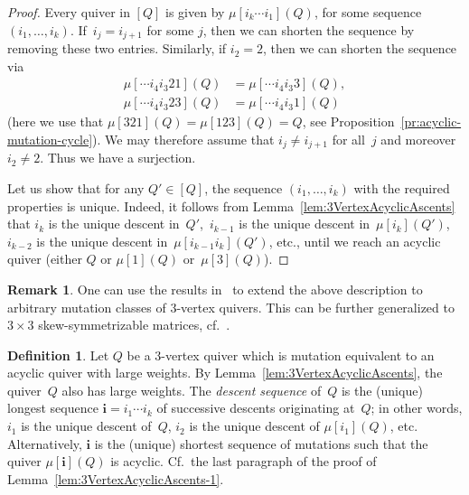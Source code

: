 \documentclass[11pt, letterpaper]{amsart}
\newcommand{\comment}[1]{{\noindent\textsf{\color{blue}$\clubsuit$~#1~$\clubsuit$}}}
\theoremstyle{definition}
\newtheorem{remark}[theorem]{Remark}
\newtheorem{definition}[theorem]{Definition}
\numberwithin{equation}{section}
\newcommand{\T}[2]{\mu[#1](#2)} %
\begin{document}
\begin{proof}
Every quiver in $[Q]$ is given by $\mu[i_k \cdots i_1](Q)$, for some sequence $(i_1,\dots,i_k)$. 
If~$i_j=i_{j+1}$ for some $j$, then we can shorten the sequence by removing these two entries.
Similarly, if $i_2=2$, then we can shorten the sequence via 
\begin{align*}
\T{\cdots i_4 i_3 2 1}{Q}&=\T{\cdots i_4 i_3 3}{Q}, \\
\T{\cdots i_4 i_3 2 3}{Q}&=\T{\cdots i_4 i_3 1}{Q}
\end{align*}
(here we use that $\T{321}{Q}=\T{123}{Q}=Q$, see Proposition~\ref{pr:acyclic-mutation-cycle}). 
We may therefore assume that $i_j \neq i_{j+1}$ for all~$j$ and moreover
$i_2\neq 2$. Thus we have a surjection.

\pagebreak[3]

Let us show that for any $Q'\in[Q]$, the sequence $(i_1,\dots,i_k)$ with the required properties is unique. 
Indeed, it follows from Lemma~\ref{lem:3VertexAcyclicAscents} that $i_k$ is the unique descent in~$Q'$,~$i_{k-1}$
 is the unique descent in~$\mu[i_k](Q')$, 
$i_{k-2}$ is the unique descent in~$\mu[i_{k-1} i_k](Q')$, etc., until we reach an acyclic quiver
(either $Q$ or $\mu[1](Q)$ or~$\mu[3](Q)$). 
\end{proof}


\begin{remark}
\label{rem:3-vertex-arbitrary}
One can use the results in~\cite{ABBS}
to extend the above description to arbitrary mutation classes of 3-vertex quivers. 
This can be further generalized to $3\times 3$ skew-symmetrizable matrices, cf.~\cite{Seven3x3}. 
\end{remark}

\begin{definition}
\label{def:height}
Let $Q$ be a $3$-vertex quiver which is mutation equivalent to an acyclic quiver with large weights. 
By Lemma~\ref{lem:3VertexAcyclicAscents}, the quiver~$Q$ also has large weights.  
The \emph{descent sequence} of~$Q$ is the (unique) longest sequence $\mathbf{i}=i_1\cdots i_k$ of successive descents
originating at~$Q$; in other words, $i_1$ is the unique descent of~$Q$,
$i_2$ is the unique descent of $\mu[i_1](Q)$, etc. 
Alternatively, $\mathbf{i}$ is the (unique) shortest sequence of mutations such that the quiver $\T{\mathbf{i}}{Q}$ is acyclic. 
Cf.\ the last paragraph of the proof of Lemma~\ref{lem:3VertexAcyclicAscents-1}. 
\end{definition}
\end{document}
